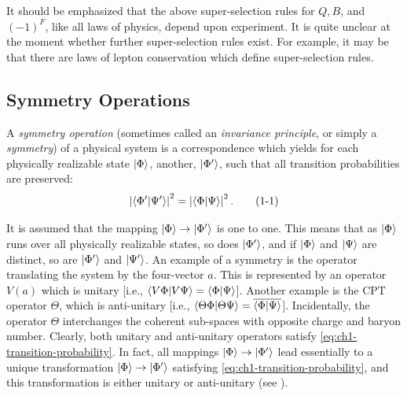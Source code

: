 It should be emphasized that the above super-selection rules for \(Q,B\), and
\((-1)^F\), like all laws of physics, depend upon experiment. It is quite
unclear at the moment whether further super-selection rules exist. For
example, it may be that there are laws of lepton conservation which define
super-selection rules.

\subsection{Symmetry Operations}\label{sec:ch1-symmetry-operations}

A \emph{symmetry operation} (sometimes called an \emph{invariance principle},
or simply a \emph{symmetry}) of a physical system is a correspondence which
yields for each physically realizable state \(\lvert \Phi\rangle\), another,
\(\lvert \Phi'\rangle\), such that all transition probabilities are preserved:
\begin{equation}
  \left|\langle \Phi'\vert \Psi'\rangle\right|^2
  =\left|\langle \Phi\vert \Psi\rangle\right|^2.
  \tag{1-1}\label{eq:ch1-transition-probability}
\end{equation}

It is assumed that the mapping \(\lvert \Phi\rangle\to\lvert \Phi'\rangle\) is one to one.
This means that as \(\lvert \Phi\rangle\) runs over all physically realizable states,
so does \(\lvert \Phi'\rangle\), and if \(\lvert \Phi\rangle\) and \(\lvert \Psi\rangle\) are
distinct, so are \(\lvert \Phi'\rangle\) and \(\lvert \Psi'\rangle\). An example of a symmetry
is the operator translating the system by the four-vector \(a\). This is
represented by an operator \(V(a)\) which is unitary [i.e.,
\(\langle V\Phi\vert V\Psi\rangle=\langle \Phi\vert \Psi\rangle\)]. Another example is the
\(\mathrm{CPT}\) operator \(\Theta\), which is anti-unitary [i.e.,
\(\langle \Theta\Phi\vert \Theta\Psi\rangle=\overline{\langle \Phi\vert \Psi\rangle}\)].
Incidentally, the operator \(\Theta\) interchanges the coherent sub-spaces
with opposite charge and baryon number. Clearly, both unitary and anti-unitary
operators satisfy \eqref{eq:ch1-transition-probability}. In fact, all mappings \(\lvert \Phi\rangle\to\lvert \Phi'\rangle\)
lead essentially to a unique transformation \(\lvert \Phi\rangle\to\lvert \Phi'\rangle\)
satisfying \eqref{eq:ch1-transition-probability}, and this transformation is either unitary or anti-unitary
(see \cite{ref:1.1}).

